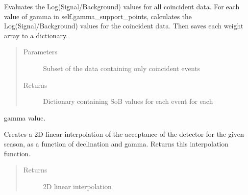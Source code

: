 \documentclass[letterpaper,10pt,english]{sphinxmanual}
\begin{document}
\begin{fulllineitems}
\begin{fulllineitems}
\end{fulllineitems}


\begin{fulllineitems}
\label{\detokenize{index:flarestack.core.llh.StandardLLH.create_SoB_energy_cache}}
Evaluates the Log(Signal/Background) values for all coincident
data. For each value of gamma in self.gamma\_support\_points, calculates
the Log(Signal/Background) values for the coincident data. Then saves
each weight array to a dictionary.
\begin{quote}\begin{description}
\item[{Parameters}] \leavevmode
{} \textendash{} Subset of the data containing only coincident events

\item[{Returns}] \leavevmode
Dictionary containing SoB values for each event for each

\end{description}\end{quote}

gamma value.

\end{fulllineitems}


\begin{fulllineitems}
\label{\detokenize{index:flarestack.core.llh.StandardLLH.create_acceptance_function}}
Creates a 2D linear interpolation of the acceptance of the detector
for the given season, as a function of declination and gamma. Returns
this interpolation function.
\begin{quote}\begin{description}
\item[{Returns}] \leavevmode
2D linear interpolation

\end{description}\end{quote}


\end{fulllineitems}
\end{fulllineitems}
\end{document}
